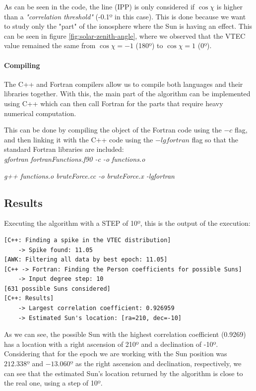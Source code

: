 As can be seen in the code, the line (IPP) is only considered if $\cos\chi$ is higher than a \textit{"correlation threshold"} (-0.1º in this case). This is done because we want to study only the "part" of the ionosphere where the Sun is having an effect. This can be seen in figure \ref{fig:solar-zenith-angle}, where we observed that the VTEC value remained the same from $\cos\chi = -1$ (180º) to $\cos\chi = 1$ (0º).

\paragraph{Compiling}

The C++ and Fortran compilers allow us to compile both languages and their libraries together. With this, the main part of the algorithm can be implemented using C++ which can then call Fortran for the parts that require heavy numerical computation.

This can be done by compiling the object of the Fortran code using the $-c$ flag, and then linking it with the C++ code using the $-lgfortran$ flag so that the standard Fortran libraries are included: \\

\textit{gfortran fortranFunctions.f90 -c -o functions.o}
	
\textit{g++ functions.o bruteForce.cc -o bruteForce.x -lgfortran}

\subsection{Results}

Executing the algorithm with a STEP of 10º, this is the output of the execution:

\begin{lstlisting}[caption=Brute force approach algorithm output]
[C++: Finding a spike in the VTEC distribution]
	-> Spike found: 11.05
[AWK: Filtering all data by best epoch: 11.05]
[C++ -> Fortran: Finding the Person coefficients for possible Suns]
	-> Input degree step: 10
[631 possible Suns considered]
[C++: Results]
	-> Largest correlation coefficient: 0.926959
	-> Estimated Sun's location: [ra=210, dec=-10]
\end{lstlisting}

As we can see, the possible Sun with the highest correlation coefficient (0.9269) has a location with a right ascension of 210º and a declination of -10º. Considering that for the epoch we are working with the Sun position was $212.338º$ and $-13.060º$ as the right ascension and declination, respectively, we can see that the estimated Sun's location returned by the algorithm is close to the real one, using a step of 10º.

